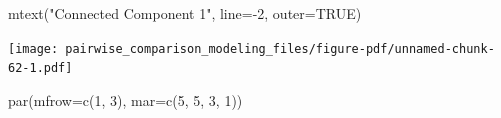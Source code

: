 \documentclass[
  letterpaper,
  DIV=11,
  numbers=noendperiod]{scrartcl}
\newenvironment{Shaded}{\begin{snugshade}}{\end{snugshade}}
\newcommand{\AttributeTok}[1]{\textcolor[rgb]{0.40,0.45,0.13}{#1}}
\newcommand{\ConstantTok}[1]{\textcolor[rgb]{0.56,0.35,0.01}{#1}}
\newcommand{\DecValTok}[1]{\textcolor[rgb]{0.68,0.00,0.00}{#1}}
\newcommand{\FunctionTok}[1]{\textcolor[rgb]{0.28,0.35,0.67}{#1}}
\newcommand{\NormalTok}[1]{\textcolor[rgb]{0.00,0.23,0.31}{#1}}
\newcommand{\SpecialCharTok}[1]{\textcolor[rgb]{0.37,0.37,0.37}{#1}}
\newcommand{\StringTok}[1]{\textcolor[rgb]{0.13,0.47,0.30}{#1}}
\begin{document}
\begin{Shaded}
\begin{Highlighting}[]
\FunctionTok{mtext}\NormalTok{(}\StringTok{"Connected Component 1"}\NormalTok{, }\AttributeTok{line=}\SpecialCharTok{{-}}\DecValTok{2}\NormalTok{, }\AttributeTok{outer=}\ConstantTok{TRUE}\NormalTok{)}
\end{Highlighting}
\end{Shaded}

\texttt{[image: pairwise\_comparison\_modeling\_files/figure-pdf/unnamed-chunk-62-1.pdf]}

\begin{Shaded}
\begin{Highlighting}[]
\FunctionTok{par}\NormalTok{(}\AttributeTok{mfrow=}\FunctionTok{c}\NormalTok{(}\DecValTok{1}\NormalTok{, }\DecValTok{3}\NormalTok{), }\AttributeTok{mar=}\FunctionTok{c}\NormalTok{(}\DecValTok{5}\NormalTok{, }\DecValTok{5}\NormalTok{, }\DecValTok{3}\NormalTok{, }\DecValTok{1}\NormalTok{))}


\end{Highlighting}
\end{Shaded}
\end{document}
